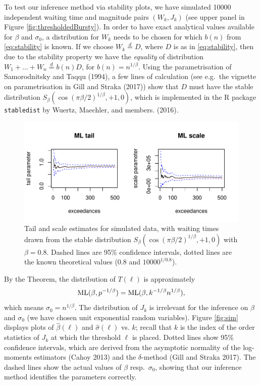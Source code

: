 \documentclass[smallextended]{svjour3}       %
\begin{document}
To test our inference method via stability plots, we have simulated
10000 independent waiting time and magnitude pairs \((W_k, J_k)\) (see
upper panel in Figure \ref{fig:thresholdedBursty}). In order to have
exact analytical values available for \(\beta\) and \(\sigma_0\), a
distribution for \(W_k\) needs to be chosen for which \(b(n)\) from
\eqref{eq:stability} is known. If we choose \(W_k \stackrel{d}{=} D\),
where \(D\) is as in \eqref{eq:stability}, then due to the stability
property we have the \emph{equality} of distribution
\(W_1 + \ldots + W_n \stackrel{d}{=} b(n) D\), for
\(b(n) = n^{1/\beta}\). Using the parametrisation of Samorodnitsky and
Taqqu (1994), a few lines of calculation (see e.g.~the vignette on
parametrisation in Gill and Straka (2017)) show that \(D\) must have the
stable distribution \(S_\beta(\cos(\pi \beta/2)^{1/\beta}, +1, 0)\),
which is implemented in the R package \texttt{stabledist} by Wuertz,
Maechler, and members. (2016).

\begin{figure}
\includegraphics[width=\textwidth]{article_springer_files/figure-latex/simulated-example-1} \caption{Tail and scale estimates for simulated data, with waiting times drawn from the stable distribution $S_\beta(\cos(\pi \beta/2)^{1/\beta}, +1, 0)$ with $\beta = 0.8$. Dashed lines are 95\% confidence intervals, dotted lines are the known theoretical values ($0.8$ and $10000^{1/0.8}$). \label{fig:sim}}\label{fig:simulated-example}
\end{figure}

By the Theorem, the distribution of \(T(\ell)\) is approximately \[
{\rm ML}(\beta, p^{-1/\beta}) 
= {\rm ML}(\beta, k^{-1/\beta} n^{1/\beta}),
\] which means \(\sigma_0 = n^{1/\beta}\). The distribution of \(J_k\)
is irrelevant for the inference on \(\beta\) and \(\sigma_0\) (we have
chosen unit exponential random variables). Figure \ref{fig:sim} displays
plots of \(\hat \beta(\ell)\) and \(\hat \sigma(\ell)\) vs. \(k\);
recall that \(k\) is the index of the order statistics of \(J_k\) at
which the threshold \(\ell\) is placed. Dotted lines show 95\%
confidence intervals, which are derived from the asymptotic normality of
the log-moments estimators (Cahoy 2013) and the \(\delta\)-method (Gill
and Straka 2017). The dashed lines show the actual values of \(\beta\)
resp.~\(\sigma_0\), showing that our inference method identifies the
parameters correctly.
\end{document}
